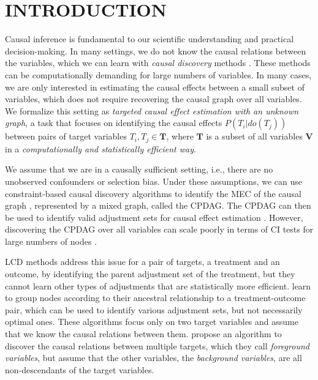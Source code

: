 \section{INTRODUCTION}
\label{sec:introduction}

Causal inference \citep{pearl2009causality} is fundamental to our scientific understanding and practical decision-making.
In many settings, we do not know the causal relations between the variables, which we can learn with \emph{causal discovery} methods \citep{glymour2019review}.
These methods can be computationally demanding for large numbers of variables.
In many cases, we are only interested in estimating the causal effects between a small subset of variables, which does not require recovering the causal graph over all variables.
We formalize this setting as \emph{targeted causal effect estimation with an unknown graph}, a task that focuses on identifying the causal effects $P(T_i|do(T_j))$  between pairs of target variables $T_i,T_j \in \mathbf{T}$, where $\mathbf{T}$ is a  subset of all variables $\mathbf{V}$ in a \emph{computationally and statistically efficient way}.

We assume that we are in a causally sufficient setting, i.e., there are no unobserved confounders or selection bias.
Under these assumptions, we can use constraint-based causal discovery algorithms \citep{spirtes2000causation} to identify the \ac{MEC} of the causal graph \citep{verma90equivalence}, represented by a mixed graph, called the \ac{CPDAG}.
The \ac{CPDAG} can then be used to identify valid adjustment sets for causal effect estimation \citep{perkovic2015complete}.
However, discovering the \acs{CPDAG} over all variables can scale poorly in terms of \ac{CI} tests for large numbers of nodes \citep{mokhtarian2021recursive}.


\Acl{LCD} methods \citep{wang2014discovering, gupta2023local} address this issue for a pair of targets, a treatment and an outcome, by identifying the parent adjustment set of the treatment, but they cannot learn other types of adjustments that are statistically more efficient.
\citet{maasch2024local} learn to group nodes according to their ancestral relationship to a treatment-outcome pair, which can be used to identify various adjustment sets, but not necessarily optimal ones.
These algorithms focus only on two target variables and assume that we know the causal relations between them.
\citet{watson2022causal} propose an algorithm to discover the causal relations between multiple targets, which they call \emph{foreground variables}, but assume 
that the other variables, the \emph{background variables}, are all non-descendants of the target variables.


